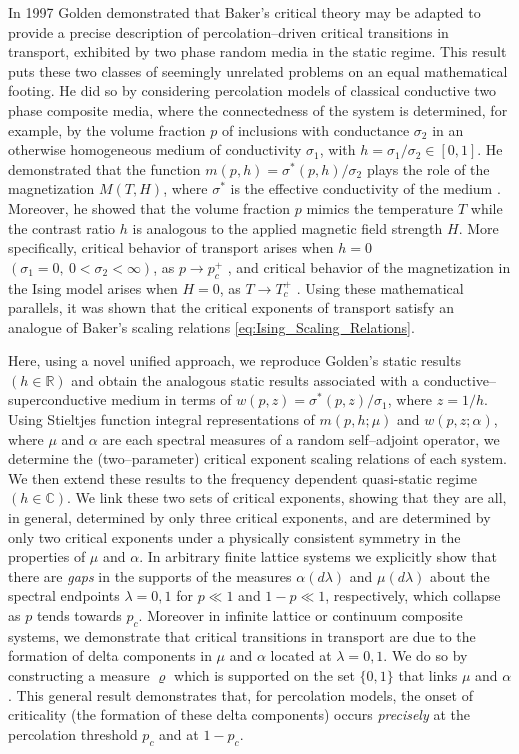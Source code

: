 \documentclass[english,12pt,jmp,graphicx]{revtex4-1}
\begin{document}
In 1997 Golden \cite{Golden:PRL-3935} demonstrated that Baker's
critical theory may be adapted to provide a precise description of
percolation--driven critical transitions in transport, exhibited by
two phase random media in the static regime. This result puts these
two classes of seemingly unrelated problems on an equal mathematical
footing. He did so by considering percolation models of classical
conductive two phase composite media, where the connectedness of the
system is determined, for example, by the volume fraction $p$ of
inclusions with conductance $\sigma_2$ in an otherwise homogeneous medium
of conductivity $\sigma_1$, with $h=\sigma_1/\sigma_2\in[0,1]$. 
He demonstrated that the function $m(p,h)=\sigma^*(p,h)/\sigma_2$ plays the role
of the magnetization  $M(T,H)$, where $\sigma^*$ is the effective
conductivity of the medium
\cite{Bergman:PRC-377,Milton:APL-300,Golden:CMP-473}. Moreover, he 
showed that the volume fraction $p$ mimics the temperature $T$ while
the contrast ratio $h$ is analogous to the applied magnetic field strength $H$. 
More specifically, critical behavior of transport
arises when $h=0$ $(\sigma_1=0, \ 0<\sigma_2<\infty)$, as $p\to p_c^+$
\cite{Golden:PRL-3935}, and 
critical behavior of the magnetization in the Ising model 
arises when $H=0$, as $T\to T_c^+$
\cite{Christensen-2005}. Using these mathematical
parallels, it was shown that the critical exponents of transport 
satisfy an analogue of Baker's %
scaling relations \eqref{eq:Ising_Scaling_Relations}.

Here, using a novel unified approach, we reproduce Golden's
static results $(h\in\mathbb{R})$ and obtain the analogous static
results associated with a conductive--superconductive medium in terms
of $w(p,z)=\sigma^*(p,z)/\sigma_1$, where $z=1/h$. Using Stieltjes function
integral representations of $m(p,h;\mu)$ and $w(p,z;\alpha)$, where $\mu$ and
$\alpha$ are each spectral measures of a random self--adjoint operator, we
determine the (two--parameter) critical exponent scaling relations of
each system. We then extend these results to the frequency dependent
quasi-static regime $(h\in\mathbb{C})$. We link these two sets of
critical exponents, showing that they are all, in general, determined
by only three critical exponents, and are determined by only two
critical exponents under a physically consistent symmetry in the
properties of $\mu$ and $\alpha$. In arbitrary finite lattice systems we
explicitly show that there are \emph{gaps} in the supports of the measures
$\alpha(d\lambda)$ and $\mu(d\lambda)$ about the spectral endpoints $\lambda=0,1$ for $p\ll1$ and
$1-p\ll1$, respectively, which collapse as $p$ tends towards
$p_c$. Moreover in infinite lattice or continuum composite systems, we
demonstrate that critical transitions in transport are due to the
formation of delta
components in $\mu$ and $\alpha$ located at
$\lambda=0,1$. We do so by constructing a measure $\varrho$ which is supported
on the set $\{0,1\}$ that links
$\mu$ and $\alpha$. This general
result demonstrates that, for percolation models, the onset of
criticality (the formation of these delta components) occurs
\emph{precisely} at the percolation threshold $p_c$ and at $1-p_c$.
%
%
%
\end{document}
